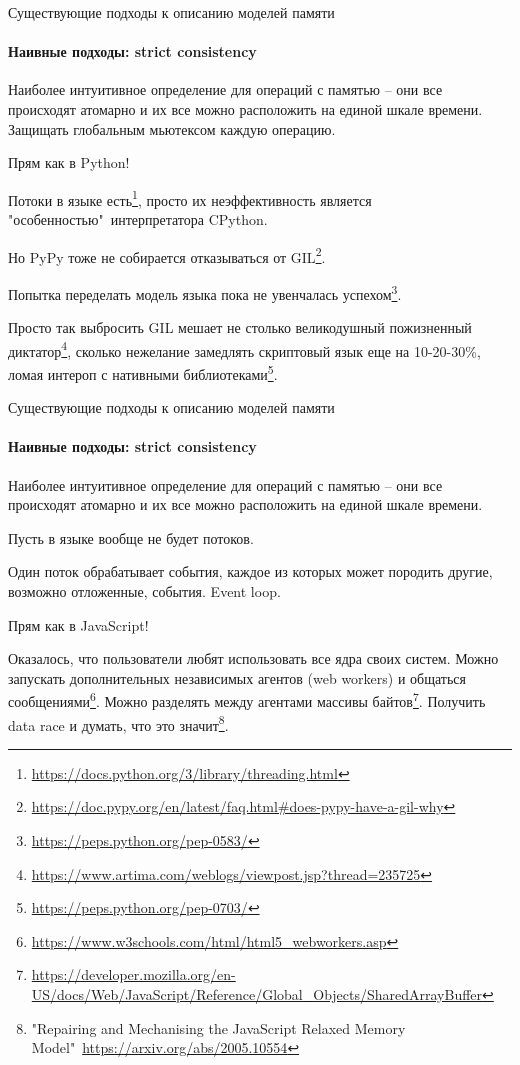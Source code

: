 \begin{frame}{Существующие подходы к описанию моделей памяти}
\framesubtitle{Наивные подходы: strict consistency}

Наиболее интуитивное определение для операций с памятью -- они все происходят атомарно и их все можно расположить на единой шкале времени.
Защищать глобальным мьютексом каждую операцию.
 
\pause
Прям как в Python!

\pause
Потоки в языке есть\footnote<3->{\tiny\url{https://docs.python.org/3/library/threading.html}}, просто их неэффективность является "особенностью"\ интерпретатора CPython.

\pause
Но PyPy тоже не собирается отказываться от GIL\footnote<4->{\tiny\url{https://doc.pypy.org/en/latest/faq.html#does-pypy-have-a-gil-why}}.

\pause
Попытка переделать модель языка пока не увенчалась успехом\footnote<5->{\tiny\url{https://peps.python.org/pep-0583/}}.

\pause
Просто так выбросить GIL мешает не столько великодушный пожизненный диктатор\footnote<6->{\tiny\url{https://www.artima.com/weblogs/viewpost.jsp?thread=235725}}, сколько нежелание замедлять скриптовый язык еще на 10-20-30\%, ломая интероп с нативными библиотеками\footnote<6->{\tiny\url{https://peps.python.org/pep-0703/}}.
\end{frame}


\begin{frame}[fragile, t]{Существующие подходы к описанию моделей памяти}
\framesubtitle{Наивные подходы: strict consistency}

Наиболее интуитивное определение для операций с памятью -- они все происходят атомарно и их все можно расположить на единой шкале времени.

\pause
Пусть в языке вообще не будет потоков.

\pause
Один поток обрабатывает события, каждое из которых может породить другие, возможно отложенные, события.
\pause
Event loop.

\pause
Прям как в JavaScript!

\pause
Оказалось, что пользователи любят использовать все ядра своих систем.
\pause
Можно запускать дополнительных независимых агентов (web workers) и общаться сообщениями\footnote<7->{\tiny\url{https://www.w3schools.com/html/html5_webworkers.asp}}.
\pause
Можно разделять между агентами массивы байтов\footnote<8->{\tiny\url{https://developer.mozilla.org/en-US/docs/Web/JavaScript/Reference/Global_Objects/SharedArrayBuffer}}.
\pause
Получить data race и думать, что это значит\footnote<9->{\tiny "Repairing and Mechanising the JavaScript Relaxed Memory Model"\ \url{https://arxiv.org/abs/2005.10554}}.

\end{frame}


